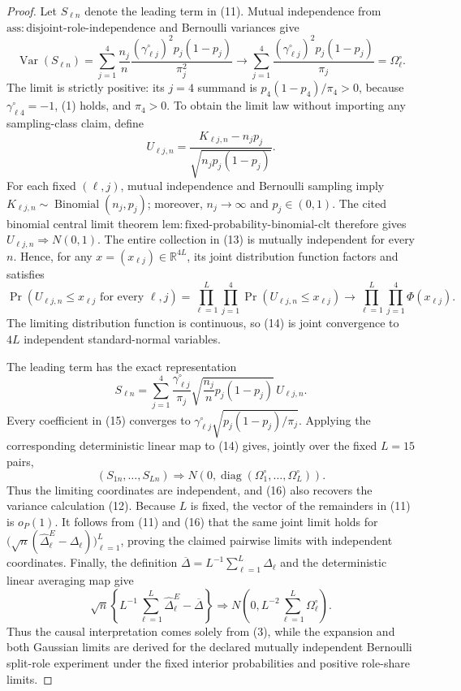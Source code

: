 \documentclass{article}
\begin{document}
\begin{proof}
Let \(S_{\ell n}\) denote the leading term in (11). Mutual independence from \(\mathrm{ass:disjoint\mbox{-}role\mbox{-}independence}\) and Bernoulli variances give
\[
 \operatorname{Var}(S_{\ell n})
 =\sum_{j=1}^4\frac{n_j}{n}
 \frac{(\gamma^{\circ}_{\ell j})^2p_j(1-p_j)}{\pi_j^2}
 \longrightarrow
 \sum_{j=1}^4\frac{(\gamma^{\circ}_{\ell j})^2p_j(1-p_j)}{\pi_j}
 =\Omega^{\circ}_\ell.
\tag{12}
\]
The limit is strictly positive: its \(j=4\) summand is \(p_4(1-p_4)/\pi_4>0\), because \(\gamma^{\circ}_{\ell4}=-1\), (1) holds, and \(\pi_4>0\). To obtain the limit law without importing any sampling-class claim, define
\[
 U_{\ell j,n}=\frac{K_{\ell j,n}-n_jp_j}{\sqrt{n_jp_j(1-p_j)}}.
\tag{13}
\]
For each fixed \((\ell,j)\), mutual independence and Bernoulli sampling imply \(K_{\ell j,n}\sim\operatorname{Binomial}(n_j,p_j)\); moreover, \(n_j\to\infty\) and \(p_j\in(0,1)\). The cited binomial central limit theorem \(\mathrm{lem:fixed\mbox{-}probability\mbox{-}binomial\mbox{-}clt}\) therefore gives \(U_{\ell j,n}\Rightarrow N(0,1)\). The entire collection in (13) is mutually independent for every \(n\). Hence, for any \(x=(x_{\ell j})\in\mathbb R^{4L}\), its joint distribution function factors and satisfies
\[
 \Pr\!\left(U_{\ell j,n}\le x_{\ell j}\text{ for every }\ell,j\right)
 =\prod_{\ell=1}^L\prod_{j=1}^4\Pr(U_{\ell j,n}\le x_{\ell j})
 \longrightarrow\prod_{\ell=1}^L\prod_{j=1}^4\Phi(x_{\ell j}).
\tag{14}
\]
The limiting distribution function is continuous, so (14) is joint convergence to \(4L\) independent standard-normal variables.

The leading term has the exact representation
\[
 S_{\ell n}=\sum_{j=1}^4
 \frac{\gamma^{\circ}_{\ell j}}{\pi_j}
 \sqrt{\frac{n_j}{n}p_j(1-p_j)}\,U_{\ell j,n}.
\tag{15}
\]
Every coefficient in (15) converges to
\(
\gamma^{\circ}_{\ell j}\sqrt{p_j(1-p_j)/\pi_j}
\).
Applying the corresponding deterministic linear map to (14) gives, jointly over the fixed \(L=15\) pairs,
\[
 (S_{1n},\ldots,S_{Ln})
 \Rightarrow N\!\left(0,\operatorname{diag}(\Omega^{\circ}_1,\ldots,\Omega^{\circ}_L)\right).
\tag{16}
\]
Thus the limiting coordinates are independent, and (16) also recovers the variance calculation (12). Because \(L\) is fixed, the vector of the remainders in (11) is \(o_P(1)\). It follows from (11) and (16) that the same joint limit holds for \(\bigl(\sqrt n(\widehat\Delta^E_\ell-\Delta_\ell)\bigr)_{\ell=1}^L\), proving the claimed pairwise limits with independent coordinates. Finally, the definition \(\overline\Delta=L^{-1}\sum_{\ell=1}^L\Delta_\ell\) and the deterministic linear averaging map give
\[
 \sqrt n\left\{L^{-1}\sum_{\ell=1}^{L}\widehat\Delta^E_{\ell}-\overline\Delta\right\}
 \Rightarrow N\!\left(0,L^{-2}\sum_{\ell=1}^{L}\Omega^{\circ}_{\ell}\right).
\]
Thus the causal interpretation comes solely from (3), while the expansion and both Gaussian limits are derived for the declared mutually independent Bernoulli split-role experiment under the fixed interior probabilities and positive role-share limits.
\end{proof}
\end{document}
